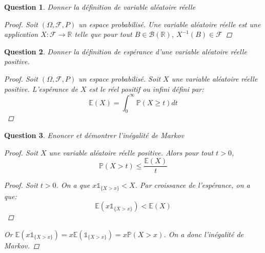 \documentclass{article}
\theoremstyle{plain}
\newtheorem{question}{Question}
\theoremstyle{definition}
\begin{document}
\begin{question}
	Donner la définition de variable aléatoire réelle
	\begin{proof}
		Soit $(\Omega, \mathscr{F}, P)$ un espace probabilisé. Une variable aléatoire réelle est une application $X:\mathscr{F} \to \mathbb{R}$  telle que pour tout $B \in \mathscr{B} (\mathbb{R})$, $X^{-1} (B) \in \mathscr{F}$
	\end{proof}
\end{question}

\begin{question}
	Donner la définition de espérance d'une variable aléatoire réelle positive.
	\begin{proof}
		Soit $(\Omega, \mathscr{F}, P)$ un espace probabilisé. Soit $X$ une variable aléatoire réelle positive. L'espérance de $X$ est le réel positif ou infini défini par:
		\begin{equation*}
			\mathbb{E} (X) = \int_0^{\infty} \mathbb{P} (X \ge t) dt
		\end{equation*}
	\end{proof}
\end{question}

\begin{question}
	Enoncer et démontrer l'inégalité de Markov
	\begin{proof}
		Soit $X$ une variable aléatoire réelle positive. Alors pour tout $t > 0$,
		\begin{equation*}
			\mathbb{P} (X > t) \le \frac{\mathbb{E} (X)}{t}
		\end{equation*}
		\begin{proof}
			Soit $t > 0$. On a que $x\mathds{1}_{\{X > x\}} < X$. Par croissance de l'espérance, on a que:
			\begin{equation*}
				\mathbb{E} (x\mathds{1}_{\{X > x\}}) < \mathbb{E} (X)
			\end{equation*}
		\end{proof}
		Or $\mathbb{E} (x\mathds{1}_{\{X > x\}}) = x\mathbb{E} (\mathds{1}_{\{X > x\}}) = x\mathbb{P} (X > x)$.
		On a donc l'inégalité de Markov.

	\end{proof}
\end{question}
\end{document}
